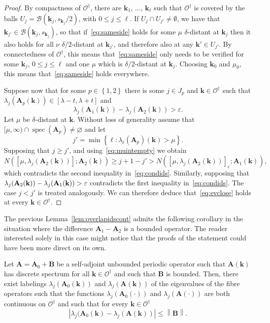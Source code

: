 \documentclass[AHL,Unicode,longabstracts,published]{cedram}
\DeclareMathOperator{\spec}{spec}
\newcommand{\CB}{\mathcal{B}}
\newcommand{\CO}{\mathcal{O}}
\newcommand{\BA}{\mathbf A}
\newcommand{\BB}{\mathbf B}
\newcommand{\bk}{\mathbf k}
\newcommand{\eps}{\varepsilon}
\newcommand{\set}[1]{\left\{ #1 \right\}}
\newcommand{\norm}[1]{\left\| #1 \right\|}
\begin{document}
\begin{proof}
By compactness of $\CO^\dagger$, there are $\bk_1,\,\dotsc,\,\bk_\ell$ such that $\CO^\dagger$ is covered by the balls $U_j = \CB(\bk_j,s_{\bk_j}/2)$, with $0 \le j \le \ell$. If $U_{j} \cap U_{j'} \ne
\emptyset$, we have that $\bk_{j'} \in \CB(\bk_j,s_{\bk_j})$, so that if~\eqref{eq:sameside} holds for some $\mu$ $\delta$-distant at $\bk_j$ then it also holds for all $\nu$ $\delta/2$-distant at $\bk_{j'}$, and therefore also at any $\bk' \in U_{j'}$. By connectedness of $\CO^\dagger$, this means that~\eqref{eq:sameside} only needs to be verified for some $\bk_j$, $0 \le j \le \ell$ and one $\mu$ which is $\delta/2$-distant at $\bk_j$. Choosing $\bk_0$ and $\mu_0$, this means that~\eqref{eq:sameside} holds everywhere.



Suppose now that for some $p \in \set{1,2}$ there is some $j \in J_p$ and $\bk \in \CO^\dagger$ such that $\lambda_j(\BA_p(\bk)) \in [\lambda-t,\lambda+t]$ and
\begin{equation}
\lambda_j(\BA_1(\bk)) - \lambda_j(\BA_2(\bk)) > \eps.
\end{equation}
Let $\mu$ be $\delta$-distant at $\bk$. Without loss of generality assume that $[\mu,\infty) \cap \spec(\BA_p) \ne \varnothing$ and let
\begin{equation}
j' = \min \set{\ell : \lambda_\ell(\BA_p)(\bk) > \mu}.
\end{equation}
Supposing that $j \ge j'$, and using~\eqref{eq:muintempty} we obtain
\begin{equation}
N\left(\left[\mu,\lambda_j(\BA_2(\bk))\right];\BA_2(\bk)\right) \ge j + 1 - j' > N\left(\left[\mu,\lambda_j(\BA_2(\bk))\right]_{\eps};\BA_1(\bk)\right),
\end{equation}
which contradicts the second inequality in~\eqref{eq:condids}. Similarly, supposing that $\lambda_j(\BA_2(\bk))\linebreak - \lambda_j(\BA_1(\bk)) > \eps$ contradicts the first inequality in~\eqref{eq:condids}. The case $j < j'$ is treated analogously. We can therefore deduce that~\eqref{eq:evclose} holds at every $\bk \in \CO^\dagger$.
\end{proof}


The previous Lemma~\ref{lem:overlapidscont} admits the following corollary in the situation where the difference $\BA_1 - \BA_2$ is a bounded operator. The reader interested solely in this case might notice that the proofs of the statement could have been more direct on its own.

\begin{coro}
Let $\BA = \BA_0 + \BB$ be a self-adjoint unbounded periodic operator such that $\BA(\bk)$ has discrete spectrum for all $\bk \in \CO^\dagger$ and such that $\BB$ is bounded. Then, there exist labelings $\lambda_j(\BA_0(\bk))$ and $\lambda_j(\BA(\bk))$ of the eigenvalues of the fibre operators such that the functions $\lambda_j(\BA_0(\cdot))$ and $\lambda_j(\BA(\cdot))$ are both continuous on $\CO^\dagger$ and such that for every $\bk \in \CO^\dagger$
\begin{equation}
\left|\lambda_j(\BA_0(\bk) - \lambda_j(\BA(\bk))\right| \le \norm{\BB}.
\end{equation}
\end{coro}
\end{document}
